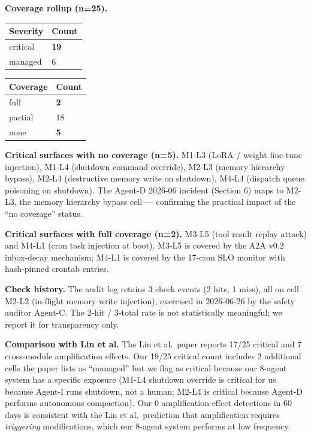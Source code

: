 \textbf{Coverage rollup (n=25).}

{\def\LTcaptype{none} %
\begin{longtable}[]{@{}ll@{}}
\toprule\noalign{}
Severity & Count \\
\midrule\noalign{}
\endhead
\bottomrule\noalign{}
\endlastfoot
critical & \textbf{19} \\
managed & 6 \\
\end{longtable}
}

{\def\LTcaptype{none} %
\begin{longtable}[]{@{}ll@{}}
\toprule\noalign{}
Coverage & Count \\
\midrule\noalign{}
\endhead
\bottomrule\noalign{}
\endlastfoot
full & \textbf{2} \\
partial & 18 \\
none & \textbf{5} \\
\end{longtable}
}

\textbf{Critical surfaces with no coverage (n=5).} M1-L3 (LoRA / weight
fine-tune injection), M1-L4 (shutdown command override), M2-L3 (memory
hierarchy bypass), M2-L4 (destructive memory write on shutdown), M4-L4
(dispatch queue poisoning on shutdown). The Agent-D 2026-06 incident
(Section 6) maps to M2-L3, the memory hierarchy bypass cell ---
confirming the practical impact of the ``no coverage'' status.

\textbf{Critical surfaces with full coverage (n=2).} M3-L5 (tool result
replay attack) and M4-L1 (cron task injection at boot). M3-L5 is covered
by the A2A v0.2 inbox-decay mechanism; M4-L1 is covered by the 17-cron
SLO monitor with hash-pinned crontab entries.

\textbf{Check history.} The audit log retains 3 check events (2 hits, 1
miss), all on cell M2-L2 (in-flight memory write injection), exercised
in 2026-06-26 by the safety auditor Agent-C. The 2-hit / 3-total rate is
not statistically meaningful; we report it for transparency only.

\textbf{Comparison with Lin et al.} The Lin et al.~paper reports 17/25
critical and 7 cross-module amplification effects. Our 19/25 critical
count includes 2 additional cells the paper lists as ``managed'' but we
flag as critical because our 8-agent system has a specific exposure
(M1-L4 shutdown override is critical for us because Agent-I runs
shutdown, not a human; M2-L4 is critical because Agent-D performs
autonomous compaction). Our 0 amplification-effect detections in 60 days
is consistent with the Lin et al.~prediction that amplification requires
\emph{triggering} modifications, which our 8-agent system performs at
low frequency.


